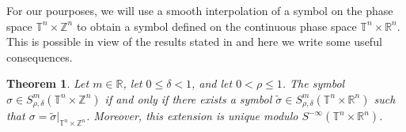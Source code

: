\documentclass[12pt, reqno]{amsart}
\newtheorem{theorem}{Theorem}[section]
\theoremstyle{definition}
\theoremstyle{remark}
\numberwithin{equation}{section}
\begin{document}
For our pourposes, we will use a smooth interpolation of a symbol on the phase space $\mathbb{T}^n \times \mathbb{Z}^n $ to obtain a symbol defined on the continuous phase space $\mathbb{T}^n \times \mathbb{R}^n $. This is possible in view of the results stated in \cite[section~4.5]{ruzhansky-turunen} and here we write some useful consequences.

\begin{theorem}
    Let $m \in \mathbb{R}$, let $0\leq\delta<1$, and let $0< \rho \leq 1$. The symbol $\sigma \in S^m_{\rho,\delta} (\mathbb{T}^n\times \mathbb{Z}^n) $  if and only if there exists a symbol $\tilde{\sigma} \in S^m_{\rho,\delta} (\mathbb{T}^n\times \mathbb{R}^n) $ such that $\sigma = \tilde{\sigma}|_{\mathbb{T}^n\times \mathbb{Z}^n} $. Moreover, this extension is unique modulo $S^{-\infty}(\mathbb{T}^n\times \mathbb{R}^n)$.
\end{theorem}
\end{document}
